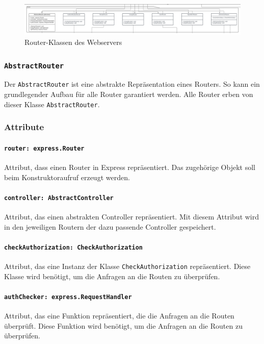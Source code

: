 \documentclass{entwurfsheft}
\begin{document}
\begin{figure}[htp]
    \centering
    \includegraphics[width = 1\textwidth]{images/webserver/router.pdf}
    \caption{Router-Klassen des Webservers}
    \label{fig:router}
\end{figure}

\subsubsection{\texttt{AbstractRouter}}\label{sec:AbstractRouter}
Der \texttt{AbstractRouter} ist eine abstrakte Repräsentation eines Routers. So kann ein grundlegender Aufbau für alle Router garantiert werden. Alle Router erben von dieser Klasse \texttt{AbstractRouter}.
\subsubsection*{Attribute}
\paragraph{\texttt{router: express.Router}}
Attribut, dass einen Router in Express repräsentiert. Das zugehörige Objekt soll beim Konstruktoraufruf erzeugt werden. 
\paragraph{\texttt{controller: AbstractController}}
Attribut, das einen abstrakten Controller repräsentiert. Mit diesem Attribut wird in den jeweiligen Routern der dazu passende Controller gespeichert.
\paragraph{\texttt{checkAuthorization: CheckAuthorization}}
Attribut, das eine Instanz der Klasse \texttt{CheckAuthorization} repräsentiert. Diese Klasse wird benötigt, um die Anfragen an die Routen zu überprüfen.
\paragraph{\texttt{authChecker: express.RequestHandler}}
Attribut, das eine Funktion repräsentiert, die die Anfragen an die Routen überprüft. Diese Funktion wird benötigt, um die Anfragen an die Routen zu überprüfen.
\end{document}
